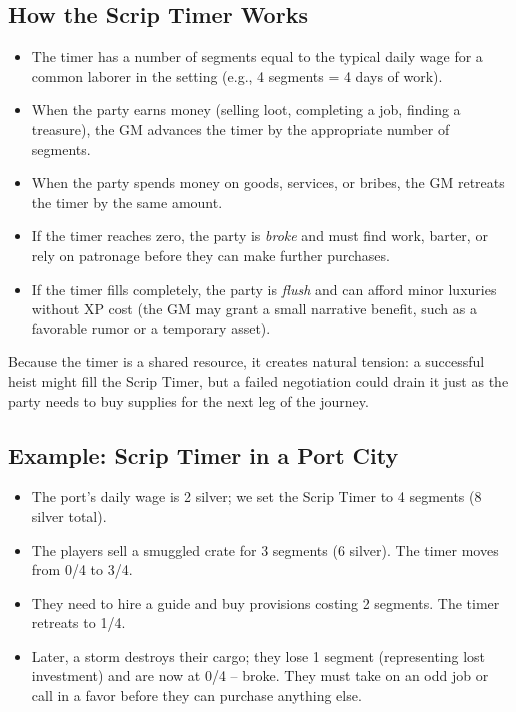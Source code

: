 \subsection{How the Scrip Timer Works}
\begin{itemize}
  \item The timer has a number of segments equal to the typical daily wage for a common laborer in the setting (e.g., 4 segments = 4 days of work).
  \item When the party earns money (selling loot, completing a job, finding a treasure), the GM advances the timer by the appropriate number of segments.
  \item When the party spends money on goods, services, or bribes, the GM retreats the timer by the same amount.
  \item If the timer reaches zero, the party is \textit{broke} and must find work, barter, or rely on patronage before they can make further purchases.
  \item If the timer fills completely, the party is \textit{flush} and can afford minor luxuries without XP cost (the GM may grant a small narrative benefit, such as a favorable rumor or a temporary asset).
\end{itemize}

Because the timer is a shared resource, it creates natural tension: a successful heist might fill the Scrip Timer, but a failed negotiation could drain it just as the party needs to buy supplies for the next leg of the journey.

\subsection{Example: Scrip Timer in a Port City}
\begin{itemize}
  \item The port's daily wage is 2 silver; we set the Scrip Timer to 4 segments (8 silver total).
  \item The players sell a smuggled crate for 3 segments (6 silver). The timer moves from 0/4 to 3/4.
  \item They need to hire a guide and buy provisions costing 2 segments. The timer retreats to 1/4.
  \item Later, a storm destroys their cargo; they lose 1 segment (representing lost investment) and are now at 0/4 -- broke. They must take on an odd job or call in a favor before they can purchase anything else.
\end{itemize}

